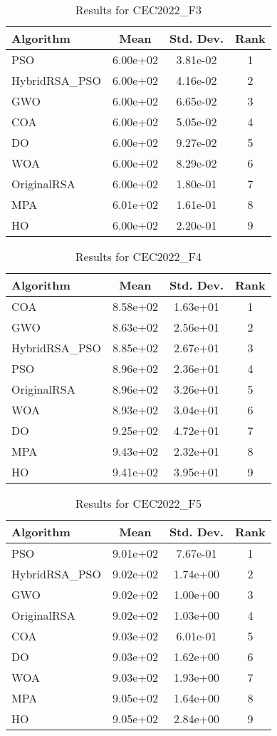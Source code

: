 \documentclass[12pt]{article}
\begin{document}
\begin{table}[H]
\centering
\caption{Results for CEC2022\_F3}
\begin{tabular}{|l|c|c|c|}
\hline
\textbf{Algorithm} & \textbf{Mean} & \textbf{Std. Dev.} & \textbf{Rank} \\
\hline
PSO & 6.00e+02 & 3.81e-02 & 1 \\
HybridRSA\_PSO & 6.00e+02 & 4.16e-02 & 2 \\
GWO & 6.00e+02 & 6.65e-02 & 3 \\
COA & 6.00e+02 & 5.05e-02 & 4 \\
DO & 6.00e+02 & 9.27e-02 & 5 \\
WOA & 6.00e+02 & 8.29e-02 & 6 \\
OriginalRSA & 6.00e+02 & 1.80e-01 & 7 \\
MPA & 6.01e+02 & 1.61e-01 & 8 \\
HO & 6.00e+02 & 2.20e-01 & 9 \\
\hline
\end{tabular}
\end{table}

\begin{table}[H]
\centering
\caption{Results for CEC2022\_F4}
\begin{tabular}{|l|c|c|c|}
\hline
\textbf{Algorithm} & \textbf{Mean} & \textbf{Std. Dev.} & \textbf{Rank} \\
\hline
COA & 8.58e+02 & 1.63e+01 & 1 \\
GWO & 8.63e+02 & 2.56e+01 & 2 \\
HybridRSA\_PSO & 8.85e+02 & 2.67e+01 & 3 \\
PSO & 8.96e+02 & 2.36e+01 & 4 \\
OriginalRSA & 8.96e+02 & 3.26e+01 & 5 \\
WOA & 8.93e+02 & 3.04e+01 & 6 \\
DO & 9.25e+02 & 4.72e+01 & 7 \\
MPA & 9.43e+02 & 2.32e+01 & 8 \\
HO & 9.41e+02 & 3.95e+01 & 9 \\
\hline
\end{tabular}
\end{table}

\begin{table}[H]
\centering
\caption{Results for CEC2022\_F5}
\begin{tabular}{|l|c|c|c|}
\hline
\textbf{Algorithm} & \textbf{Mean} & \textbf{Std. Dev.} & \textbf{Rank} \\
\hline
PSO & 9.01e+02 & 7.67e-01 & 1 \\
HybridRSA\_PSO & 9.02e+02 & 1.74e+00 & 2 \\
GWO & 9.02e+02 & 1.00e+00 & 3 \\
OriginalRSA & 9.02e+02 & 1.03e+00 & 4 \\
COA & 9.03e+02 & 6.01e-01 & 5 \\
DO & 9.03e+02 & 1.62e+00 & 6 \\
WOA & 9.03e+02 & 1.93e+00 & 7 \\
MPA & 9.05e+02 & 1.64e+00 & 8 \\
HO & 9.05e+02 & 2.84e+00 & 9 \\
\hline
\end{tabular}
\end{table}
\end{document}
